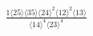 \documentclass[varwidth, border=5pt]{standalone}
\begin{document}
\begin{my}
$\begin{gathered}
\scriptscriptstyle\frac{1⟨25⟩⟨35⟩⟨24⟩^2⟨12⟩^2⟨13⟩}{⟨14⟩^4⟨23⟩^4}
\end{gathered}$
\end{my}
\end{document}

